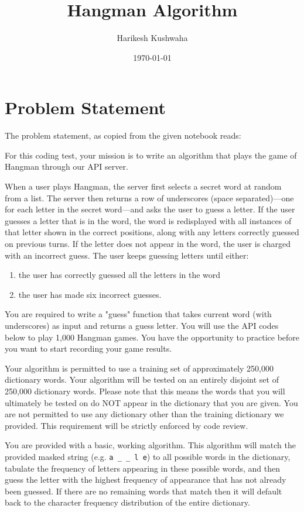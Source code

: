 \documentclass[12pt]{article}
\date{\today}
\title{Hangman Algorithm}
\author{Harikesh Kushwaha}
\begin{document}
\maketitle
\section{Problem Statement}
The problem statement, as copied from the given notebook reads:

For this coding test, your mission is to write an algorithm that plays the game of Hangman through our API server.

When a user plays Hangman, the server first selects a secret word at random from a list. The server then returns a row of underscores (space separated)—one for each letter in the secret word—and asks the user to guess a letter. If the user guesses a letter that is in the word, the word is redisplayed with all instances of that letter shown in the correct positions, along with any letters correctly guessed on previous turns. If the letter does not appear in the word, the user is charged with an incorrect guess. The user keeps guessing letters until either:
\begin{enumerate}
    \item the user has correctly guessed all the letters in the word
    \item the user has made six incorrect guesses.
\end{enumerate}

You are required to write a "guess" function that takes current word (with underscores) as input and returns a guess letter. You will use the API codes below to play 1,000 Hangman games. You have the opportunity to practice before you want to start recording your game results.

Your algorithm is permitted to use a training set of approximately 250,000 dictionary words. Your algorithm will be tested on an entirely disjoint set of 250,000 dictionary words. Please note that this means the words that you will ultimately be tested on do NOT appear in the dictionary that you are given. You are not permitted to use any dictionary other than the training dictionary we provided. This requirement will be strictly enforced by code review.

You are provided with a basic, working algorithm. This algorithm will match the provided masked string (e.g. \verb|a _ _ l e|) to all possible words in the dictionary, tabulate the frequency of letters appearing in these possible words, and then guess the letter with the highest frequency of appearance that has not already been guessed. If there are no remaining words that match then it will default back to the character frequency distribution of the entire dictionary.
\end{document}
